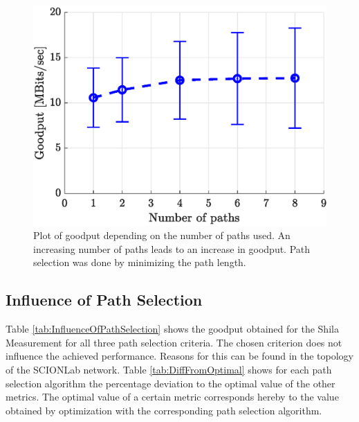 \begin{figure}
	\begin{center}
		\includegraphics[scale=0.65]{../illustrations/performanceEvaluation/PerformanceWrtPathShortestpath.eps}  
		\caption[Caption for the list of figures.]{Plot of goodput depending on the number of paths used. An increasing number of paths leads to an increase in goodput. Path selection was done by minimizing the path length.}
		\label{fig:GoodputWrtToNOfPathsForShortestPath}
	\end{center}
\end{figure}

\subsection*{Influence of Path Selection}
\label{subsec:InfluencePathSelection}

Table \ref{tab:InfluenceOfPathSelection} shows the goodput obtained for the Shila Measurement for all three path selection criteria. The chosen criterion does not influence the achieved performance. Reasons for this can be found in the topology of the SCIONLab network. Table \ref{tab:DiffFromOptimal}  shows for each path selection algorithm the percentage deviation to the optimal value of the other metrics. The optimal value of a certain metric corresponds hereby to the value obtained by optimization with the corresponding path selection algorithm. 

